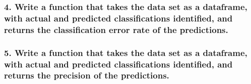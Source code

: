 \documentclass[]{article}
\newenvironment{Shaded}{\begin{snugshade}}{\end{snugshade}}
\newcommand{\KeywordTok}[1]{\textcolor[rgb]{0.13,0.29,0.53}{\textbf{{#1}}}}
\newcommand{\DecValTok}[1]{\textcolor[rgb]{0.00,0.00,0.81}{{#1}}}
\newcommand{\StringTok}[1]{\textcolor[rgb]{0.31,0.60,0.02}{{#1}}}
\newcommand{\NormalTok}[1]{{#1}}
\begin{document}
\subsubsection{4. Write a function that takes the data set as a
dataframe, with actual and predicted classifications identified, and
returns the classification error rate of the
predictions.}\label{write-a-function-that-takes-the-data-set-as-a-dataframe-with-actual-and-predicted-classifications-identified-and-returns-the-classification-error-rate-of-the-predictions.}

\begin{Shaded}
\end{Shaded}

\subsubsection{5. Write a function that takes the data set as a
dataframe, with actual and predicted classifications identified, and
returns the precision of the
predictions.}\label{write-a-function-that-takes-the-data-set-as-a-dataframe-with-actual-and-predicted-classifications-identified-and-returns-the-precision-of-the-predictions.}

\begin{Shaded}
\end{Shaded}
\end{document}
